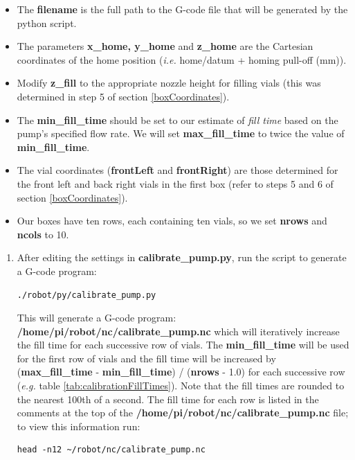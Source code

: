 \documentclass[]{book}
\providecommand{\tightlist}{%
  \setlength{\itemsep}{0pt}\setlength{\parskip}{0pt}}
\theoremstyle{definition}
\theoremstyle{definition}
\theoremstyle{remark}
\begin{document}
\begin{itemize}
\tightlist
\item
  The \textbf{filename} is the full path to the G-code file that will be
  generated by the python script.
\item
  The parameters \textbf{x\_home, y\_home} and \textbf{z\_home} are the
  Cartesian coordinates of the home position (\emph{i.e.} home/datum +
  homing pull-off (mm)).
\item
  Modify \textbf{z\_fill} to the appropriate nozzle height for filling
  vials (this was determined in step 5 of section \ref{boxCoordinates}).
\item
  The \textbf{min\_fill\_time} should be set to our estimate of
  \emph{fill time} based on the pump's specified flow rate. We will set
  \textbf{max\_fill\_time} to twice the value of
  \textbf{min\_fill\_time}.
\item
  The vial coordinates (\textbf{frontLeft} and \textbf{frontRight}) are
  those determined for the front left and back right vials in the first
  box (refer to steps 5 and 6 of section \ref{boxCoordinates}).
\item
  Our boxes have ten rows, each containing ten vials, so we set
  \textbf{nrows} and \textbf{ncols} to 10.
\end{itemize}

\begin{enumerate}
\def\labelenumi{\arabic{enumi}.}
\setcounter{enumi}{2}
\item
  After editing the settings in \textbf{calibrate\_pump.py}, run the
  script to generate a G-code program:

\begin{verbatim}
./robot/py/calibrate_pump.py
\end{verbatim}

  This will generate a G-code program:
  \textbf{/home/pi/robot/nc/calibrate\_pump.nc} which will iteratively
  increase the fill time for each successive row of vials. The
  \textbf{min\_fill\_time} will be used for the first row of vials and
  the fill time will be increased by (\textbf{max\_fill\_time} -
  \textbf{min\_fill\_time}) / (\textbf{nrows} - 1.0) for each successive
  row (\emph{e.g.} table \ref{tab:calibrationFillTimes}). Note that the
  fill times are rounded to the nearest 100th of a second. The fill time
  for each row is listed in the comments at the top of the
  \textbf{/home/pi/robot/nc/calibrate\_pump.nc} file; to view this
  information run:

\begin{verbatim}
head -n12 ~/robot/nc/calibrate_pump.nc
\end{verbatim}
\end{enumerate}
\end{document}
